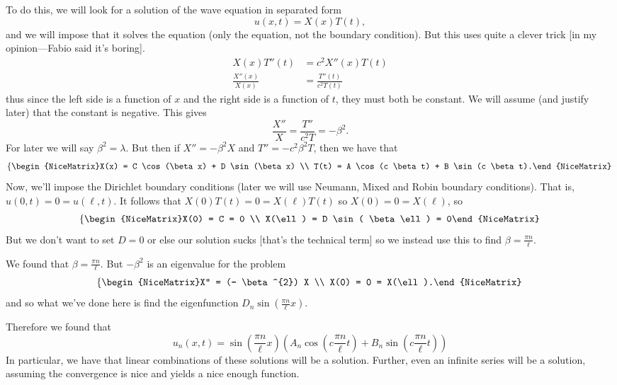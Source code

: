 To do this, we will look for a solution of the wave equation in separated form
\[ u(x, t) = X(x)T(t), \]
and we will impose that it solves the equation (only the equation, not the boundary condition). But this uses quite a clever trick [in my opinion---Fabio said it's boring]. 
\begin{align*}
	X(x) T''(t) &= c^{2} X''(x) T(t) \\
	\frac{X''(x)}{X(x)} &= \frac{T''(t)}{c^{2}T(t)}
\end{align*}
thus since the left side is a function of \( x \) and the right side is a function of \( t \), they must both be constant. We will assume (and justify later) that the constant is negative. This gives
\[ \frac{X''}{X} = \frac{T''}{c^{2} T} = - \beta^{2}. \]
For later we will say \( \beta^{2} = \lambda \). But then if \( X'' = - \beta^{2} X \) and \( T'' = - c^{2} \beta^{2} T  \), then we have that
\[ \left\{\begin{NiceMatrix}X(x) = C \cos(\beta x) + D \sin(\beta x) \\ T(t) = A \cos(c \beta t) + B \sin(c \beta t).\end{NiceMatrix}\right.  \]
Now, we'll impose the Dirichlet boundary conditions (later we will use Neumann, Mixed and Robin boundary conditions). That is, \( u(0, t) = 0 = u(\ell, t) \).
It follows that \( X(0)T(t) = 0 = X( \ell)T(t) \) so \( X(0) = 0 = X(\ell) \), so
\[ \left\{\begin{NiceMatrix}X(0) = C = 0 \\ X(\ell) = D \sin( \beta \ell) = 0\end{NiceMatrix}\right.  \]
But we don't want to set \( D = 0 \) or else our solution sucks [that's the technical term] so we instead use this to find \( \beta = \frac{\pi n}{\ell} \).

\begin{remark}
	We found that \( \beta = \frac{\pi n}{\ell} \). But \( - \beta^{2} \) is an eigenvalue for the problem
	\[ \left\{\begin{NiceMatrix}X'' = (- \beta^{2}) X  \\ X(0) = 0 = X(\ell).\end{NiceMatrix}\right. \]
	and so what we've done here is find the eigenfunction \( D_{n} \sin \left(  \frac{\pi n}{\ell}x \right) \). 
\end{remark}

Therefore we found that
\[ u_{n}(x, t) = \sin \left( \frac{\pi n}{\ell} x \right) \left( A_{n} \cos \left( c \frac{\pi n}{\ell} t \right) + B_{n} \sin \left( c \frac{\pi n}{\ell} t \right) \right) \]
In particular, we have that linear combinations of these solutions will be a solution. Further, even an infinite series will be a solution, assuming the convergence is nice and yields a nice enough function.

